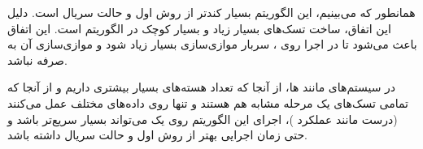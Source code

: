 \documentclass{HW}
\begin{document}
همانطور که می‌بینیم، این الگوریتم بسیار کندتر از روش اول و حالت سریال است. دلیل این اتفاق، ساخت تسک‌های بسیار زیاد و بسیار کوچک در الگوریتم است. این اتفاق باعث می‌شود تا در اجرا روی ، سربار موازی‌سازی بسیار زیاد شود و موازی‌سازی آن به صرفه نباشد.

در سیستم‌های  مانند ها، از آنجا که تعداد هسته‌های بسیار بیشتری داریم و از آنجا که تمامی تسک‌های یک مرحله مشابه هم هستند و تنها روی داده‌های مختلف عمل می‌کنند (درست مانند عملکرد )، اجرای این الگوریتم روی یک  می‌تواند بسیار سریع‌تر باشد و حتی زمان اجرایی بهتر از روش اول و حالت سریال داشته باشد.


%
\end{document}
